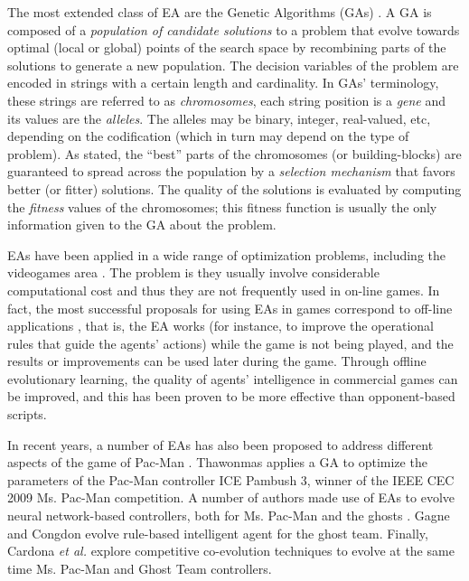 \documentclass{llncs}
\begin{document}
The most extended class of EA are the Genetic Algorithms (GAs) \cite{GAs_Goldberg89}. A GA is composed of a \textit{population of candidate solutions} to a problem that evolve towards optimal (local or global) points of the search space by recombining parts of the solutions to generate a new population. The decision variables of the problem are encoded in strings with a certain length and cardinality. In GAs' terminology, these strings are referred to as \textit{chromosomes}, each string position is a \textit{gene} and its values are the \textit{alleles}. The alleles may be binary, integer, real-valued, etc, depending on the codification (which in turn may depend on the type of problem). 
As stated, the ``best'' parts of the chromosomes (or building-blocks) are guaranteed to spread across the population by a \textit{selection mechanism} that favors better (or fitter) solutions. The quality of the solutions is evaluated by computing the \textit{fitness} values of the chromosomes; this fitness function is usually the only information given to the GA about the problem. 

EAs have been applied in a wide range of optimization problems, including the videogames area \cite{cooperativebots_CIG2010}. The problem is they usually involve considerable computational cost and thus they are not frequently used in on-line games. In fact, the most successful proposals for using EAs in games correspond to off-line applications \cite{evolutionary_learning-offline}, that is, the EA works (for instance, to improve the operational rules that guide the agents' actions) while the game is not being played, and the results or improvements can be used later during the game. Through offline evolutionary learning, the quality of agents' intelligence in commercial games can be improved, and this has been proven to be more effective than opponent-based scripts.

In recent years, a number of EAs has also been proposed to address different aspects of the game of Pac-Man \cite{Gallagher03,Galvan-Lopez10,Alhejali10,Brandstetter12,AlhejaliLucas11}. Thawonmas \cite{Thawonmas10} applies a GA to optimize the parameters of the Pac-Man controller ICE Pambush 3, winner of the IEEE CEC 2009 Ms. Pac-Man competition. A number of authors made use of EAs to evolve neural network-based controllers, both for Ms. Pac-Man \cite{Lucas05,Burrow09,Keunhyun10} and the ghosts \cite{Jia-Yue11}. Gagne and Congdon \cite{Gagne2012} evolve rule-based intelligent agent for the ghost team. Finally, Cardona \textit{et al.} \cite{Cardona13} explore competitive co-evolution techniques to evolve at the same time Ms. Pac-Man and Ghost Team controllers.
\end{document}
